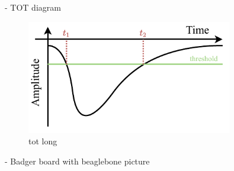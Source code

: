 - TOT diagram
\begin{figure}
    \includegraphics[width=0.8\textwidth]{diagrams/5-daq/tot.pdf}
    \caption[tot short]{tot long}
    \label{fig:tot}
\end{figure}
- Badger board with beaglebone picture
\begin{figure}

\end{figure}
